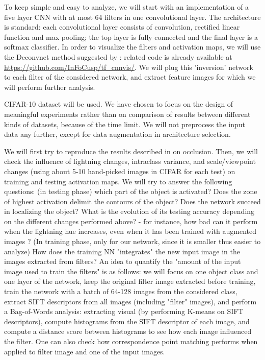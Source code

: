 \documentclass[10pt,twocolumn,letterpaper]{article}
\begin{document}
To keep simple and easy to analyze, we will start with an implementation of a five layer CNN with at most 64 filters in one convolutional layer. The architecture is standard: each convolutional layer consists of convolution, rectified linear function and max pooling; the top layer is fully connected and the final layer is a softmax classifier. 
In order to visualize the filters and activation maps, we will use the  
Deconvnet method suggested by \cite{zeiler2014visualizing}: related code is already available at \url{https://github.com/InFoCusp/tf_cnnvis/}. We will plug this 'inversion' network to each filter of the considered network, and extract feature images for which we will perform further analysis.

CIFAR-10 dataset will be used. We have chosen to focus on the design  
of meaningful experiments rather than on comparison of results between  
different kinds of datasets, because of the time limit. We will not  
preprocess the input data any further, except for data augmentation in  
architecture selection.

We will first try to reproduce the results described in \cite{zeiler2014visualizing} on occlusion. Then, we will check the influence of lightning changes, intraclass variance, and scale/viewpoint changes (using about 5-10 hand-picked images in CIFAR  
for each test) on training and testing activation maps. We will try to answer the following questions: (in testing phase) which part of the  
object is activated? Does the zone of highest activation delimit the  
contours of the object? Does the network succeed in localizing the  
object? What is the evolution of its testing accuracy depending on the  
different changes performed above? - for instance, how bad can it  
perform when the lightning hue increases, even when it has been  
trained with augmented images ? (In training phase, only for our  
network, since it is smaller thus easier to analyze) How does the  
training NN "integrates" the new input image in the images extracted  
from filters? An idea to quantify the "amount of the input image used  
to train the filters" is as follows: we will focus on one object  
class and one layer of the network, keep the original filter image  
extracted before training, train the network with a batch of 64-128  
images from the considered class, extract SIFT descriptors from all  
images (including "filter" images), and perform a Bag-of-Words  
analysis: extracting visual  (by performing K-means on SIFT descriptors), compute histograms from the SIFT  
descriptor of each image, and compute a distance score between  
histograms to see how each image influenced the filter. One can also  
check how correspondence point matching performs when applied to  
filter image and one of the input images. 
\end{document}
